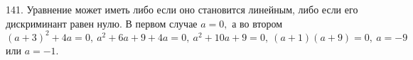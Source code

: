 141. Уравнение может иметь либо если оно становится линейным, либо если его дискриминант равен нулю. В первом случае $a=0,$ а во втором
$(a+3)^2+4a=0,\ a^2+6a+9+4a=0,\ a^2+10a+9=0,\ (a+1)(a+9)=0,\ a=-9$ или $a=-1.$\\
